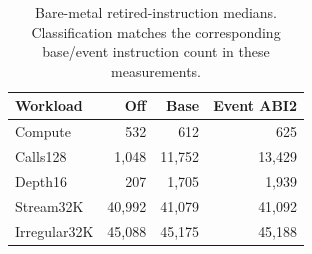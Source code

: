\begin{table}[t]\centering\small
\begin{tabular}{lrrr}\toprule
Workload & Off & Base & Event ABI2\\\midrule
Compute & 532 & 612 & 625\\
Calls128 & 1,048 & 11,752 & 13,429\\
Depth16 & 207 & 1,705 & 1,939\\
Stream32K & 40,992 & 41,079 & 41,092\\
Irregular32K & 45,088 & 45,175 & 45,188\\
\bottomrule\end{tabular}
\caption{Bare-metal retired-instruction medians. Classification matches the corresponding base/event instruction count in these measurements.}\label{tab:bareinst}
\end{table}
